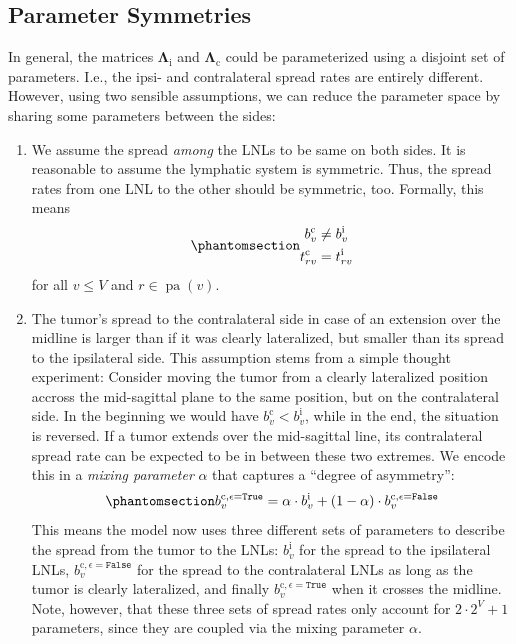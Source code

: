 \documentclass[
  sn-mathphys-num,
]{sn-jnl}
\providecommand{\tightlist}{%
  \setlength{\itemsep}{0pt}\setlength{\parskip}{0pt}}\usepackage{longtable,booktabs,array}
\begin{document}
\subsection{Parameter Symmetries}\label{sec-params-symmetry}

In general, the matrices \(\boldsymbol{\Lambda}_\text{i}\) and
\(\boldsymbol{\Lambda}_\text{c}\) could be parameterized using a
disjoint set of parameters. I.e., the ipsi- and contralateral spread
rates are entirely different. However, using two sensible assumptions,
we can reduce the parameter space by sharing some parameters between the
sides:

\begin{enumerate}
\def\labelenumi{\arabic{enumi}.}
\tightlist
\item
  We assume the spread \emph{among} the LNLs to be same on both sides.
  It is reasonable to assume the lymphatic system is symmetric. Thus,
  the spread rates from one LNL to the other should be symmetric, too.
  Formally, this means\\
  \begin{equation}\phantomsection\label{eq-symmetries}{
  \begin{aligned}
  b_v^\text{c} &\neq b_v^\text{i} \\
  t_{rv}^\text{c} &= t_{rv}^\text{i}
  \end{aligned}
  }\end{equation} for all \(v \leq V\) and
  \(r \in \operatorname{pa}(v)\).
\item
  The tumor's spread to the contralateral side in case of an extension
  over the midline is larger than if it was clearly lateralized, but
  smaller than its spread to the ipsilateral side. This assumption stems
  from a simple thought experiment: Consider moving the tumor from a
  clearly lateralized position accross the mid-sagittal plane to the
  same position, but on the contralateral side. In the beginning we
  would have \(b_v^\text{c} < b_v^\text{i}\), while in the end, the
  situation is reversed. If a tumor extends over the mid-sagittal line,
  its contralateral spread rate can be expected to be in between these
  two extremes. We encode this in a \emph{mixing parameter} \(\alpha\)
  that captures a ``degree of asymmetry'':\\
  \begin{equation}\phantomsection\label{eq-mixing}{
  b_v^{\text{c},\epsilon=\texttt{True}} = \alpha \cdot b_v^\text{i} + (1 - \alpha) \cdot b_v^{\text{c},\epsilon=\texttt{False}}
  }\end{equation} This means the model now uses three different sets of
  parameters to describe the spread from the tumor to the LNLs:
  \(b^\text{i}_v\) for the spread to the ipsilateral LNLs,
  \(b_v^{\text{c},\epsilon=\texttt{False}}\) for the spread to the
  contralateral LNLs as long as the tumor is clearly lateralized, and
  finally \(b_v^{\text{c},\epsilon=\texttt{True}}\) when it crosses the
  midline. Note, however, that these three sets of spread rates only
  account for \(2 \cdot 2^V + 1\) parameters, since they are coupled via
  the mixing parameter \(\alpha\).
\end{enumerate}
\end{document}
